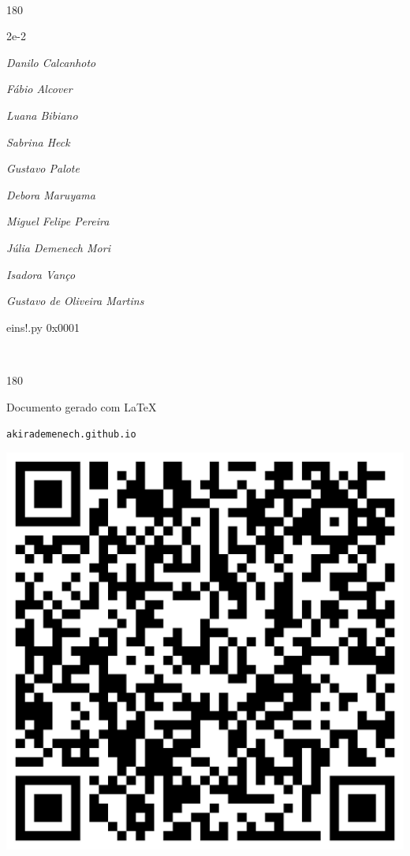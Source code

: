 \documentclass[12pt]{article}
\begin{document}
\pagebreak			

	\ 
	\vfill
	\begin{turn}{180}	
		\begin{minipage}{\textwidth}
		  	\ttfamily %
			\centering
			{\Huge 2e-2}
		  
			\hfill
		  
			

\textit{\small Danilo Calcanhoto}

\textit{\small Fábio Alcover}

\textit{\small Luana Bibiano}

\textit{\small Sabrina Heck}

\textit{\small Gustavo Palote}

\textit{\small Debora Maruyama}

\textit{\small Miguel Felipe Pereira}

\textit{\small Júlia Demenech Mori}

\textit{\small Isadora Vanço}

\textit{\small Gustavo de Oliveira Martins}

\bigskip

eins!.py
0x0001


		\end{minipage}	
	\end{turn}
	\vfill
	\

\pagebreak

	\begin{turn}{180}	
		\begin{minipage}{\textwidth}		  
		  Documento gerado com \LaTeX			
		  
		  \texttt{akirademenech.github.io}

		  \includegraphics[height=0.3\textheight]{2e-2.pdf}

		\end{minipage}	
	\end{turn}  
		  
\end{document}
